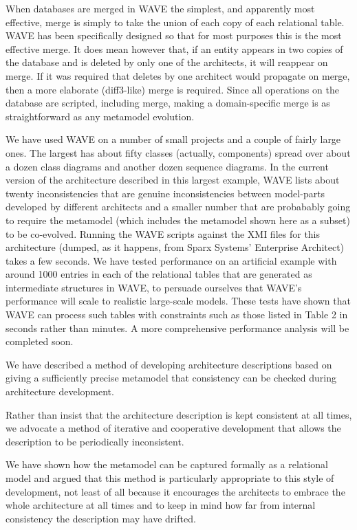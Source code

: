 \documentclass[times, 10pt,twocolumn]{article}
\begin{document}
When databases are merged in WAVE the simplest, and apparently most effective, merge is simply to take the union of each copy of each relational table. WAVE has been specifically designed so that for most purposes this is the most effective merge. It does mean however that, if an entity appears in two copies of the database and is deleted by only one of the architects, it will reappear on merge. If it was required that deletes by one architect would propagate on merge, then a more elaborate (diff3-like) merge is required. Since all operations on the database are scripted, including merge, making a domain-specific merge is as straightforward as any metamodel evolution. 

We have used WAVE on a number of small projects and a couple of fairly large ones. The largest has about fifty classes (actually, components) spread over about a dozen class diagrams and another dozen sequence diagrams. In the current version of the architecture described in this largest example, WAVE lists about twenty inconsistencies that are genuine inconsistencies between model-parts developed by different architects and a smaller number that are probabably going to require the metamodel (which includes the metamodel shown here as a subset) to be co-evolved. Running the WAVE scripts against the XMI files for this architecture (dumped, as it happens, from Sparx Systems' Enterprise Architect) takes a few seconds. We have tested performance on an artificial example with around 1000 entries in each of the relational tables that are generated as intermediate structures in WAVE, to persuade ourselves that WAVE's performance will scale to realistic large-scale models. These tests have shown that WAVE can process such tables with constraints such as those listed in Table 2 in seconds rather than minutes. A more comprehensive performance analysis will be completed soon. 
 
\noindent We have described a method of developing architecture descriptions based on giving a sufficiently precise metamodel that consistency can be checked during architecture development.

Rather than insist that the architecture description is kept consistent at all times, we advocate a method of iterative and cooperative development that allows the description to be periodically inconsistent.

We have shown how the metamodel can be captured formally as a relational model and argued that this method is particularly appropriate to this style of development, not least of all because it encourages the architects to embrace the whole architecture at all times and to keep in mind how far from internal consistency the description may have drifted.
\end{document}
